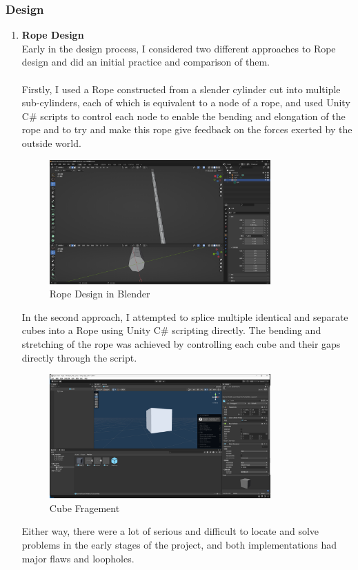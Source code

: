 \documentclass[12pt]{article}
\begin{document}
\subsubsection{Design}
\begin{enumerate}
      \item \textbf{Rope Design}
      \label{sec:rope}
      \\
      Early in the design process, I considered two different approaches to Rope design and did an initial practice and comparison of them.
      \\\\
      Firstly, I used a Rope constructed from a slender cylinder cut into multiple sub-cylinders, each of which is equivalent to a node of a rope, and used Unity C\# scripts to control each node to enable the bending and elongation of the rope and to try and make this rope give feedback on the forces exerted by the outside world.
      \begin{figure}[H]
            \centering
            \includegraphics[width=0.8\textwidth]{blender design.png}
            \caption{Rope Design in Blender}
      \end{figure}
      In the second approach, I attempted to splice multiple identical and separate cubes into a Rope using Unity C\# scripting directly. The bending and stretching of the rope was achieved by controlling each cube and their gaps directly through the script.
      \begin{figure}[H]
            \centering
            \includegraphics[width=0.8\textwidth]{cube.png}
            \caption{Cube Fragement}
      \end{figure}
      Either way, there were a lot of serious and difficult to locate and solve problems in the early stages of the project, and both implementations had major flaws and loopholes.


\end{enumerate}
\end{document}
